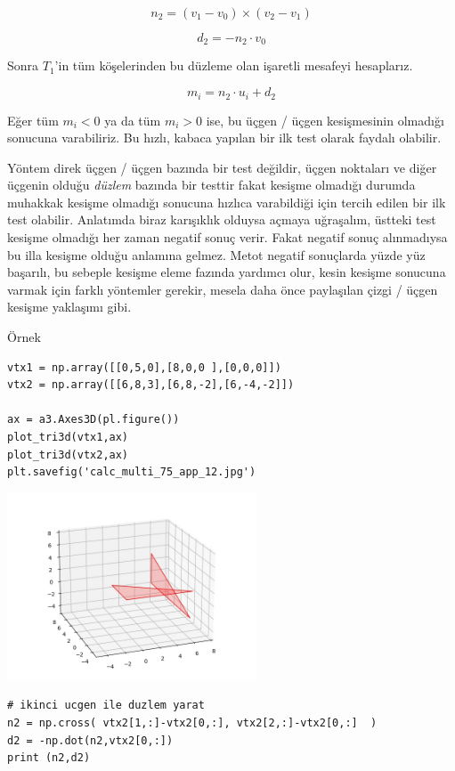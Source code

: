 \documentclass[12pt,fleqn]{article}\usepackage{../../common}
\begin{document}
$$
n_2 = (v_1-v_0) \times (v_2 - v_1)
$$

$$
d_2 = -n_2 \cdot v_0
$$

Sonra $T_1$'in tüm köşelerinden bu düzleme olan işaretli mesafeyi hesaplarız.

$$
m_i = n_2 \cdot u_i + d_2
$$

Eğer tüm $m_i < 0$ ya da tüm $m_i > 0$ ise, bu üçgen / üçgen kesişmesinin
olmadığı sonucuna varabiliriz. Bu hızlı, kabaca yapılan bir ilk test olarak
faydalı olabilir.

Yöntem direk üçgen / üçgen bazında bir test değildir, üçgen noktaları ve diğer
üçgenin olduğu {\em düzlem} bazında bir testtir fakat kesişme olmadığı durumda
muhakkak kesişme olmadığı sonucuna hızlıca varabildiği için tercih edilen bir
ilk test olabilir. Anlatımda biraz karışıklık olduysa açmaya uğraşalım, üstteki
test kesişme olmadığı her zaman negatif sonuç verir. Fakat negatif sonuç
alınmadıysa bu illa kesişme olduğu anlamına gelmez. Metot negatif sonuçlarda
yüzde yüz başarılı, bu sebeple kesişme eleme fazında yardımcı olur, kesin
kesişme sonucuna varmak için farklı yöntemler gerekir, mesela daha önce
paylaşılan çizgi / üçgen kesişme yaklaşımı gibi.

Örnek

\begin{verbatim}
vtx1 = np.array([[0,5,0],[8,0,0 ],[0,0,0]])
vtx2 = np.array([[6,8,3],[6,8,-2],[6,-4,-2]])

ax = a3.Axes3D(pl.figure())
plot_tri3d(vtx1,ax)
plot_tri3d(vtx2,ax)
plt.savefig('calc_multi_75_app_12.jpg')
\end{verbatim}

\includegraphics[width=20em]{calc_multi_75_app_12.jpg}

\begin{verbatim}
# ikinci ucgen ile duzlem yarat
n2 = np.cross( vtx2[1,:]-vtx2[0,:], vtx2[2,:]-vtx2[0,:]  )
d2 = -np.dot(n2,vtx2[0,:])
print (n2,d2)
\end{verbatim}
\end{document}
